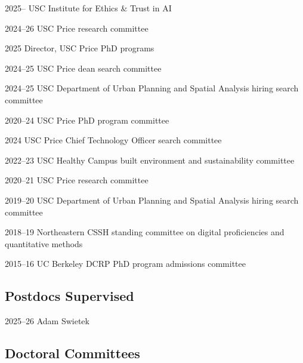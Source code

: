 \documentclass[11pt,a4paper]{report} %
\begin{document}
\begin{tablist}
\item[2025--]   \tab{}USC Institute for Ethics \& Trust in AI
\item[2024--26] \tab{}USC Price research committee
\item[2025]     \tab{}Director, USC Price PhD programs
\item[2024--25] \tab{}USC Price dean search committee
\item[2024--25] \tab{}USC Department of Urban Planning and Spatial Analysis hiring search committee
\item[2020--24] \tab{}USC Price PhD program committee
\item[2024]     \tab{}USC Price Chief Technology Officer search committee
\item[2022--23] \tab{}USC Healthy Campus built environment and sustainability committee
\item[2020--21] \tab{}USC Price research committee
\item[2019--20] \tab{}USC Department of Urban Planning and Spatial Analysis hiring search committee
\item[2018--19] \tab{}Northeastern CSSH standing committee on digital proficiencies and quantitative methods
\item[2015--16] \tab{}UC Berkeley DCRP PhD program admissions committee

\end{tablist}

\subsection*{Postdocs Supervised}

\begin{tablist}

\item[2025--26] \tab{}Adam Swietek

\end{tablist}

\subsection*{Doctoral Committees}
\end{document}
